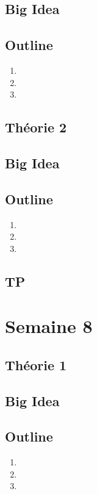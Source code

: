 \documentclass{article}
\begin{document}
\subsection*{Big Idea}
\subsection*{Outline}
\begin{enumerate}
    \item
    \item
    \item
\end{enumerate}
\subsection{Théorie 2}
\subsection*{Big Idea}
\subsection*{Outline}
\begin{enumerate}
    \item
    \item
    \item
\end{enumerate}
\subsection{TP}

\pagebreak
\section{Semaine 8}
\subsection{Théorie 1}
\subsection*{Big Idea}
\subsection*{Outline}
\begin{enumerate}
    \item
    \item
    \item
\end{enumerate}
\end{document}
